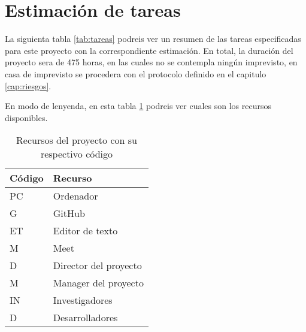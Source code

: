 \section{Estimación de tareas}
\label{sec:estimacion_tareas}

La siguienta tabla \ref{tab:tareas} podreis ver un resumen de las tareas especificadas para este proyecto con la correspondiente estimación. En total,
la duración del proyecto sera de 475 horas, en las cuales no se contempla ningún imprevisto, en casa de imprevisto se procedera con el protocolo definido
en el capitulo \ref{cap:riesgos}.

En modo de lenyenda, en esta tabla \ref{tab:recursos} podreis ver cuales son los recursos disponibles.

\begin{table}[H]
    \centering
    \begin{tabular}{|l|l|}
    \hline
    \rowcolor[HTML]{8EA9D8} 
    Código & Recurso               \\ \hline
    PC     & Ordenador             \\ \hline
    G      & GitHub                \\ \hline
    ET     & Editor de texto       \\ \hline
    M      & Meet                  \\ \hline
    D      & Director del proyecto \\ \hline
    M      & Manager del proyecto  \\ \hline
    IN     & Investigadores        \\ \hline
    D      & Desarrolladores       \\ \hline
    \end{tabular}
    \caption{Recursos del proyecto con su respectivo código}
    \label{tab:recursos}
\end{table}

